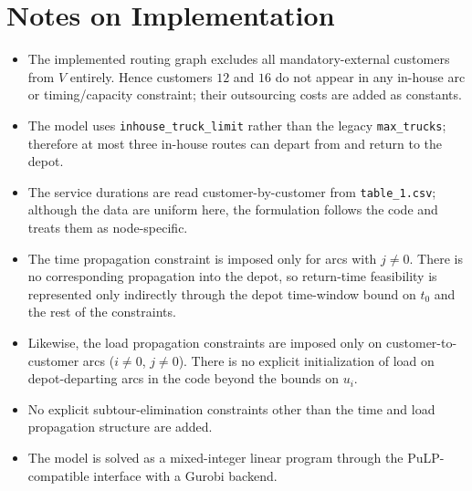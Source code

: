 \section*{Notes on Implementation}

\begin{itemize}
    \item The implemented routing graph excludes all mandatory-external customers from $V$ entirely. Hence customers $12$ and $16$ do not appear in any in-house arc or timing/capacity constraint; their outsourcing costs are added as constants.
    \item The model uses \texttt{inhouse\_truck\_limit} rather than the legacy \texttt{max\_trucks}; therefore at most three in-house routes can depart from and return to the depot.
    \item The service durations are read customer-by-customer from \texttt{table\_1.csv}; although the data are uniform here, the formulation follows the code and treats them as node-specific.
    \item The time propagation constraint is imposed only for arcs with $j\neq 0$. There is no corresponding propagation into the depot, so return-time feasibility is represented only indirectly through the depot time-window bound on $t_0$ and the rest of the constraints.
    \item Likewise, the load propagation constraints are imposed only on customer-to-customer arcs ($i\neq 0$, $j\neq 0$). There is no explicit initialization of load on depot-departing arcs in the code beyond the bounds on $u_i$.
    \item No explicit subtour-elimination constraints other than the time and load propagation structure are added.
    \item The model is solved as a mixed-integer linear program through the PuLP-compatible interface with a Gurobi backend.
\end{itemize}
